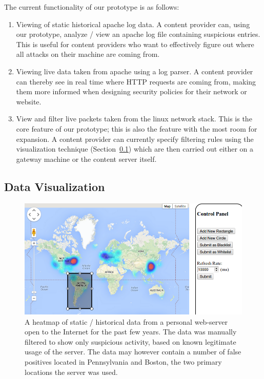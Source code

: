 \documentclass[aps,preprint,amsmath,amssymb]{revtex4}
\begin{document}
The current functionality of our prototype is as follows:

\begin{enumerate}
\item Viewing of static historical apache log data. A content provider can, using our prototype,
analyze / view an apache log file containing suspicious entries. This is useful for content
providers who want to effectively figure out where all attacks on their machine are coming from.
\item Viewing live data taken from apache using a log parser. A content provider can thereby
see in real time where HTTP requests are coming from, making them more informed when designing
security policies for their network or website.
\item View and filter live packets taken from the linux network stack. This is the core feature
of our prototype; this is also the feature with the most room for expansion. A content provider
can currently specify filtering rules using the visualization technique (Section~\ref{sec:visualization})
which are then carried out either on a gateway machine or the content server itself.
\end{enumerate}
\subsection{Data Visualization}
\label{sec:visualization}

\begin{figure}
\includegraphics[width=\columnwidth]{control_panel.png}
\caption{\label{fig:map} A heatmap of static / historical data from a personal
web-server open to the Internet for the past few years.
The data was manually filtered to show only
suspicious activity, based on known legitimate usage of the server. The data may
however contain a number of false positives located in Pennsylvania and Boston,
the two primary locations the server was used.}
\end{figure}
\end{document}
